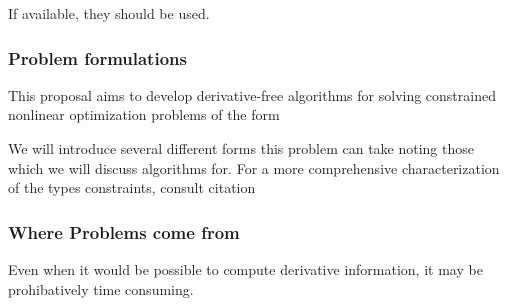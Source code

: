 









If available, they should be used. 


\subsubsection{Problem formulations}

This proposal aims to develop derivative-free algorithms for solving constrained nonlinear optimization problems of the form

We will introduce several different forms this problem can take noting those which we will discuss algorithms for.
For a more comprehensive characterization of the types constraints, consult \color{red}citation\color{black} %


\subsubsection{Where Problems come from}








Even when it would be possible to compute derivative information, it may be prohibatively time consuming.








